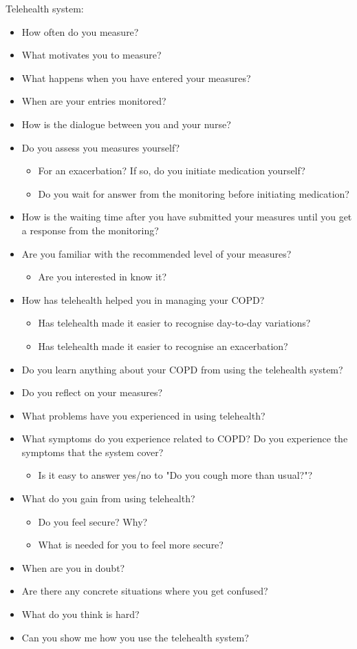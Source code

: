 Telehealth system:
\begin{itemize}
	\item How often do you measure?
	\item What motivates you to measure?
	\item What happens when you have entered your measures?
	\item When are your entries monitored?
	\item How is the dialogue between you and your nurse?
	\item Do you assess you measures yourself?
	\begin{itemize}
		\item For an exacerbation? If so, do you initiate medication yourself?
		\item Do you wait for answer from the monitoring before initiating medication?
	\end{itemize}
	\item How is the waiting time after you have submitted your measures until you get a response from the monitoring?
	\item Are you familiar with the recommended level of your measures?
	\begin{itemize}
		\item Are you interested in know it?
	\end{itemize}
	\item How has telehealth helped you in managing your COPD?
	\begin{itemize}
		\item Has telehealth made it easier to recognise day-to-day variations?
		\item Has telehealth made it easier to recognise an exacerbation?
	\end{itemize}
	\item Do you learn anything about your COPD from using the telehealth system?
	\item Do you reflect on your measures?
	\item What problems have you experienced in using telehealth?
	\item What symptoms do you experience related to COPD? Do you experience the symptoms that the system cover?
	\begin{itemize}
		\item Is it easy to answer yes/no to "Do you cough more than usual?"?
	\end{itemize}
	\item What do you gain from using telehealth?
	\begin{itemize}
		\item Do you feel secure? Why?
		\item What is needed for you to feel more secure?
	\end{itemize}
	\item When are you in doubt?
	\item Are there any concrete situations where you get confused?
	\item What do you think is hard?
	\item Can you show me how you use the telehealth system?
\end{itemize}

